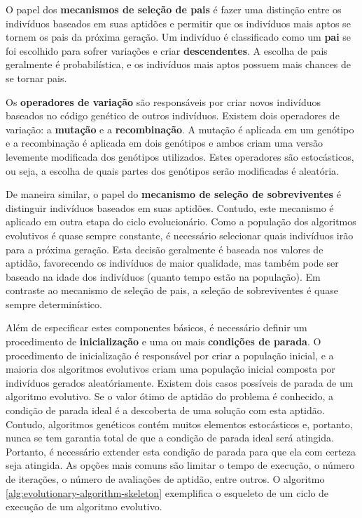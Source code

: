 O papel dos \textbf{mecanismos de seleção de pais} é fazer uma distinção entre
os indivíduos baseados em suas aptidões e permitir que os indivíduos mais aptos
se tornem os pais da próxima geração. Um indivíduo é classificado como um
\textbf{pai} se foi escolhido para sofrer variações e criar
\textbf{descendentes}. A escolha de pais geralmente é probabilística, e os
indivíduos mais aptos possuem mais chances de se tornar pais.

Os \textbf{operadores de variação} são responsáveis por criar novos indivíduos
baseados no código genético de outros indivíduos. Existem dois operadores de
variação: a \textbf{mutação} e a \textbf{recombinação}. A mutação é aplicada em
um genótipo e a recombinação é aplicada em dois genótipos e ambos criam uma
versão levemente modificada dos genótipos utilizados. Estes operadores são
estocásticos, ou seja, a escolha de quais partes dos genótipos serão modificadas
é aleatória.

De maneira similar, o papel do \textbf{mecanismo de seleção de sobreviventes} é
distinguir indivíduos baseados em suas aptidões. Contudo, este mecanismo é
aplicado em outra etapa do ciclo evolucionário. Como a população dos algoritmos
evolutivos é quase sempre constante, é necessário selecionar quais indivíduos
irão para a próxima geração. Esta decisão geralmente é baseada nos valores de
aptidão, favorecendo os indivíduos de maior qualidade, mas também pode ser
baseado na idade dos indivíduos (quanto tempo estão na população). Em contraste
ao mecanismo de seleção de pais, a seleção de sobreviventes é quase sempre
determinístico.

Além de especificar estes componentes básicos, é necessário definir um
procedimento de \textbf{inicialização} e uma ou mais \textbf{condições de
parada}. O procedimento de inicialização é responsável por criar a população
inicial, e a maioria dos algoritmos evolutivos criam uma população inicial
composta por indivíduos gerados aleatóriamente. Existem dois casos possíveis de
parada de um algoritmo evolutivo. Se o valor ótimo de aptidão do problema é
conhecido, a condição de parada ideal é a descoberta de uma solução com esta
aptidão. Contudo, algoritmos genéticos contém muitos elementos estocásticos e,
portanto, nunca se tem garantia total de que a condição de parada ideal será
atingida. Portanto, é necessário extender esta condição de parada para que ela
com certeza seja atingida. As opções mais comuns são limitar o tempo de
execução, o número de iterações, o número de avaliações de aptidão, entre
outros. O algoritmo \ref{alg:evolutionary-algorithm-skeleton} exemplifica o
esqueleto de um ciclo de execução de um algoritmo evolutivo.

